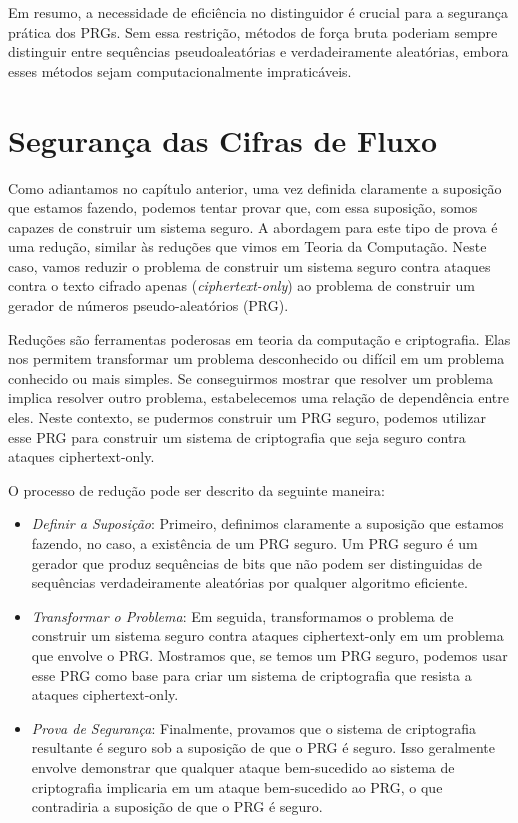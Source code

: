 Em resumo, a necessidade de eficiência no distinguidor é crucial para a segurança prática dos PRGs.
Sem essa restrição, métodos de força bruta poderiam sempre distinguir entre sequências pseudoaleatórias e verdadeiramente aleatórias, embora esses métodos sejam computacionalmente impraticáveis.


\section{Segurança das Cifras de Fluxo}
\label{sec:streamcipher-sec}

Como adiantamos no capítulo anterior, uma vez definida claramente a suposição que estamos fazendo, podemos tentar provar que, com essa suposição, somos capazes de construir um sistema seguro.
A abordagem para este tipo de prova é uma redução, similar às reduções que vimos em Teoria da Computação.
Neste caso, vamos reduzir o problema de construir um sistema seguro contra ataques contra o texto cifrado apenas ({\em ciphertext-only}) ao problema de construir um gerador de números pseudo-aleatórios (PRG).

Reduções são ferramentas poderosas em teoria da computação e criptografia.
Elas nos permitem transformar um problema desconhecido ou difícil em um problema conhecido ou mais simples.
Se conseguirmos mostrar que resolver um problema implica resolver outro problema, estabelecemos uma relação de dependência entre eles.
Neste contexto, se pudermos construir um PRG seguro, podemos utilizar esse PRG para construir um sistema de criptografia que seja seguro contra ataques ciphertext-only.

O processo de redução pode ser descrito da seguinte maneira:

\begin{itemize}
\item {\em Definir a Suposição}:
  Primeiro, definimos claramente a suposição que estamos fazendo, no caso, a existência de um PRG seguro.
  Um PRG seguro é um gerador que produz sequências de bits que não podem ser distinguidas de sequências verdadeiramente aleatórias por qualquer algoritmo eficiente.

\item {\em Transformar o Problema}:
  Em seguida, transformamos o problema de construir um sistema seguro contra ataques ciphertext-only em um problema que envolve o PRG.
  Mostramos que, se temos um PRG seguro, podemos usar esse PRG como base para criar um sistema de criptografia que resista a ataques ciphertext-only.

\item {\em Prova de Segurança}:
  Finalmente, provamos que o sistema de criptografia resultante é seguro sob a suposição de que o PRG é seguro.
  Isso geralmente envolve demonstrar que qualquer ataque bem-sucedido ao sistema de criptografia implicaria em um ataque bem-sucedido ao PRG, o que contradiria a suposição de que o PRG é seguro.
\end{itemize}

